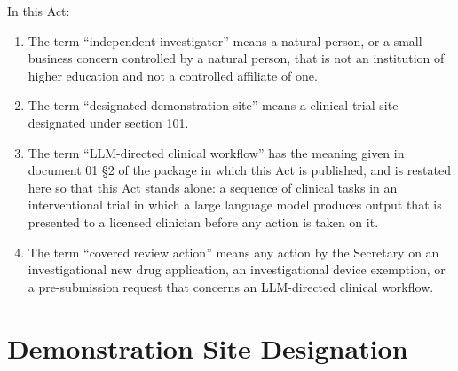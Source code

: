 In this Act:

\begin{enumerate}
\item The term ``independent investigator'' means a natural person, or a small
  business concern controlled by a natural person, that is not an institution of
  higher education and not a controlled affiliate of one.

\item The term ``designated demonstration site'' means a clinical trial site
  designated under section 101.

\item The term ``LLM-directed clinical workflow'' has the meaning given in
  document 01 §2 of the package in which this Act is published, and is
  restated here so that this Act stands alone: a sequence of clinical tasks in
  an interventional trial in which a large language model produces output that
  is presented to a licensed clinician before any action is taken on it.

\item The term ``covered review action'' means any action by the Secretary on an
  investigational new drug application, an investigational device exemption, or a
  pre-submission request that concerns an LLM-directed clinical workflow.
\end{enumerate}

\section{Demonstration Site Designation}

